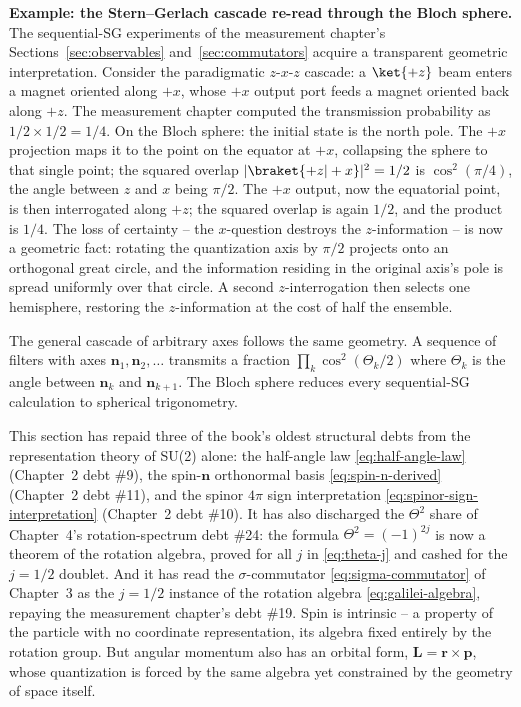 \medskip\noindent\textbf{Example: the Stern--Gerlach cascade re-read through the Bloch sphere.}
The sequential-SG experiments of the measurement chapter's Sections~\ref{sec:observables} and~\ref{sec:commutators} acquire a transparent geometric interpretation. Consider the paradigmatic $z$-$x$-$z$ cascade: a $\ket{+z}$ beam enters a magnet oriented along $+x$, whose $+x$ output port feeds a magnet oriented back along $+z$. The measurement chapter computed the transmission probability as $1/2 \times 1/2 = 1/4$. On the Bloch sphere: the initial state is the north pole. The $+x$ projection maps it to the point on the equator at $+x$, collapsing the sphere to that single point; the squared overlap $|\braket{+z|+x}|^2 = 1/2$ is $\cos^2(\pi/4)$, the angle between $z$ and $x$ being $\pi/2$. The $+x$ output, now the equatorial point, is then interrogated along $+z$; the squared overlap is again $1/2$, and the product is $1/4$. The loss of certainty -- the $x$-question destroys the $z$-information -- is now a geometric fact: rotating the quantization axis by $\pi/2$ projects onto an orthogonal great circle, and the information residing in the original axis's pole is spread uniformly over that circle. A second $z$-interrogation then selects one hemisphere, restoring the $z$-information at the cost of half the ensemble.

The general cascade of arbitrary axes follows the same geometry. A sequence of filters with axes $\bm n_1,\bm n_2,\ldots$ transmits a fraction $\prod_k \cos^2(\Theta_k/2)$ where $\Theta_k$ is the angle between $\bm n_k$ and $\bm n_{k+1}$. The Bloch sphere reduces every sequential-SG calculation to spherical trigonometry.

This section has repaid three of the book's oldest structural debts from the representation theory of SU(2) alone: the half-angle law \eqref{eq:half-angle-law} (Chapter~2 debt \#9), the spin-$\bm n$ orthonormal basis \eqref{eq:spin-n-derived} (Chapter~2 debt \#11), and the spinor $4\pi$ sign interpretation \eqref{eq:spinor-sign-interpretation} (Chapter~2 debt \#10). It has also discharged the $\Theta^2$ share of Chapter~4's rotation-spectrum debt \#24: the formula $\Theta^2 = (-1)^{2j}$ is now a theorem of the rotation algebra, proved for all $j$ in \eqref{eq:theta-j} and cashed for the $j=1/2$ doublet. And it has read the $\sigma$-commutator \eqref{eq:sigma-commutator} of Chapter~3 as the $j=1/2$ instance of the rotation algebra \eqref{eq:galilei-algebra}, repaying the measurement chapter's debt \#19. Spin is intrinsic -- a property of the particle with no coordinate representation, its algebra fixed entirely by the rotation group. But angular momentum also has an orbital form, $\bm L = \bm r \times \bm p$, whose quantization is forced by the same algebra yet constrained by the geometry of space itself.


